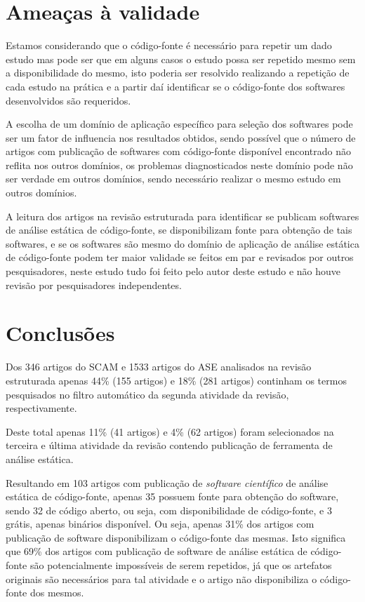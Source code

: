 \section{Ameaças à validade}

Estamos considerando que o código-fonte é necessário para repetir um dado
estudo mas pode ser que em alguns casos o estudo possa ser repetido mesmo sem a
disponibilidade do mesmo, isto poderia ser resolvido realizando a repetição
de cada estudo na prática e a partir daí identificar se o código-fonte dos
softwares desenvolvidos são requeridos.

A escolha de um domínio de aplicação específico para seleção dos softwares
pode ser um fator de influencia nos resultados obtidos, sendo possível que
o número de artigos com publicação de softwares com código-fonte disponível
encontrado não reflita nos outros domínios, os problemas diagnosticados
neste domínio pode não ser verdade em outros domínios, sendo necessário
realizar o mesmo estudo em outros domínios.

A leitura dos artigos na revisão estruturada para identificar se publicam
softwares de análise estática de código-fonte, se disponibilizam fonte para
obtenção de tais softwares, e se os softwares são mesmo do domínio de aplicação
de análise estática de código-fonte podem ter maior validade se feitos em
par e revisados por outros pesquisadores, neste estudo tudo foi feito pelo
autor deste estudo e não houve revisão por pesquisadores independentes.

\section{Conclusões}

Dos 346 artigos do SCAM e 1533 artigos do ASE analisados na revisão estruturada
apenas 44\% (155 artigos) e 18\% (281 artigos) continham os termos pesquisados
no filtro automático da segunda atividade da revisão, respectivamente.

Deste total apenas 11\% (41 artigos) e 4\% (62 artigos) foram selecionados na
terceira e última atividade da revisão contendo publicação de ferramenta de
análise estática.

Resultando em 103 artigos com publicação de {\it software científico} de
análise estática de código-fonte, apenas 35 possuem fonte para obtenção do
software, sendo 32 de código aberto, ou seja, com disponibilidade de
código-fonte, e 3 grátis, apenas binários disponível. Ou seja, apenas 31\% dos
artigos com publicação de software disponibilizam o código-fonte das mesmas.
Isto significa que 69\% dos artigos com publicação de software de análise
estática de código-fonte são potencialmente impossíveis de serem repetidos, já
que os artefatos originais são necessários para tal atividade e o artigo não
disponibiliza o código-fonte dos mesmos.

